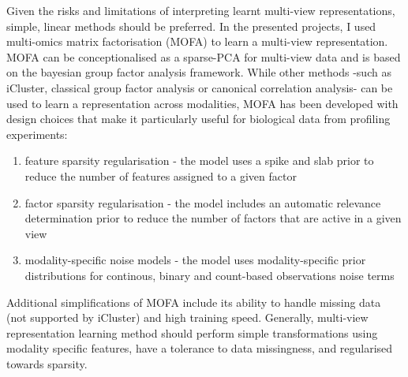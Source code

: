 \begin{flushleft}
Given the risks and limitations of interpreting learnt multi-view representations, simple, linear methods should be preferred. In the presented projects, I used multi-omics matrix factorisation (MOFA) to learn a multi-view representation. MOFA can be conceptionalised as a sparse-PCA for multi-view data and is based on the bayesian group factor analysis framework. While other methods -such as iCluster, classical group factor analysis or canonical correlation analysis- can be used to learn a representation across modalities, MOFA has been developed with design choices that make it particularly useful for biological data from profiling experiments:
\bigbreak

\begin{enumerate}
    \item feature sparsity regularisation - the model uses a spike and slab prior to reduce the number of features assigned to a given factor
    \item factor sparsity regularisation - the model includes an automatic relevance determination prior to reduce the number of factors that are active in a given view
    \item modality-specific noise models -  the model uses modality-specific prior distributions for continous, binary and count-based observations noise terms 
\end{enumerate}

Additional simplifications of MOFA include its ability to handle missing data (not supported by iCluster) and high training speed. Generally, multi-view representation learning method should perform simple transformations using modality specific features, have a tolerance to data missingness, and regularised towards sparsity. 
\bigbreak


\end{flushleft}
